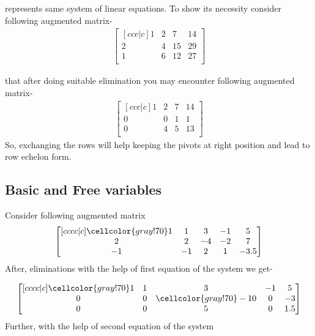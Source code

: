 \documentclass{article}
\newcommand\bg{\cellcolor{gray!70}}
\begin{document}
\) represents same system of linear equations. To show its necessity consider following augmented matrix-
\begin{align}
\begin{bmatrix}[ccc|c] 
1 & 2 & 7 & 14 \\
2 & 4 & 15 & 29 \\
1 & 6 & 12 & 27 \\
\end{bmatrix}\nonumber
\end{align}

that after doing suitable elimination you may encounter following augmented matrix-\\
\begin{align}
\begin{bmatrix}[ccc|c] 
1 & 2 & 7 & 14 \\
0 & 0 & 1 & 1 \\
0 & 4 & 5 & 13 \\
\end{bmatrix}\nonumber
\end{align}
So, exchanging the rows will help keeping the pivots at right position and lead to row echelon form.\\

\subsection{Basic and Free variables}
Consider following augmented matrix
\begin{align}
\begin{bmatrix}[cccc|c] 
 \bg1 & 1 & 3 & -1 & 5 \\
2 & 2 & -4 & -2 & 7 \\
-1 & -1 & 2 & 1 & -3.5 
\end{bmatrix}\nonumber
\end{align}
After, eliminations with the help of first equation of the system we get-

\begin{align}
\begin{bmatrix}[cccc|c] 
 \bg1 & 1 & 3 & -1 & 5 \\
0 & 0 & \bg-10 & 0 & -3 \\
0 & 0 & 5 & 0 & 1.5 
\end{bmatrix}\nonumber
\end{align}
Further, with the help of second equation of the system
\end{document}
